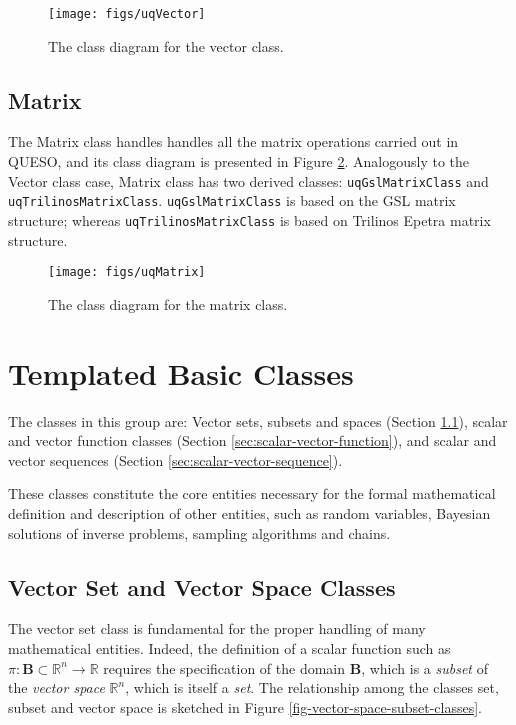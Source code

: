 \begin{figure}[!hpt]
\centering
\texttt{[image: figs/uqVector]}
\vspace*{-8pt}
\caption{ The class diagram for the vector class.}
\label{fig-vector-class}
\end{figure}



\subsection{Matrix}


The Matrix class handles handles all the matrix operations carried out in QUESO, and its class diagram is presented in Figure \ref{fig-matrix-class}. Analogously to the Vector class case,
Matrix class has two derived classes: \verb+uqGslMatrixClass+ and \verb+uqTrilinosMatrixClass+. \verb+uqGslMatrixClass+ is based on the GSL matrix structure; whereas \verb+uqTrilinosMatrixClass+ is based on Trilinos Epetra matrix structure.


\begin{figure}[!hp]
\centering
\texttt{[image: figs/uqMatrix]}
\vspace*{-8pt}
\caption{The class diagram for the matrix class.}
\label{fig-matrix-class}
\end{figure}


\section{Templated Basic Classes}
The classes in this group are: Vector sets, subsets and spaces (Section \ref{sec:vector-set-space}), scalar and vector function classes (Section \ref{sec:scalar-vector-function}), and scalar and vector sequences (Section \ref{sec:scalar-vector-sequence}).

These classes constitute the core entities necessary for the formal
mathematical definition and description of other entities, such as
random variables, Bayesian solutions of inverse problems, sampling algorithms and chains.



\subsection{Vector Set  and Vector Space Classes}\label{sec:vector-set-space}
%
The vector set class is fundamental for the proper handling of many mathematical entities.
Indeed, the definition of a scalar function such as $\pi:\mathbf{B}\subset\mathbb{R}^n\rightarrow\mathbb{R}$ requires the
specification of the domain $\mathbf{B}$, which is a {\it subset} of the {\it vector space} $\mathbb{R}^n$, which is itself a {\it set}.
The relationship among the classes set, subset and vector space is sketched in Figure \ref{fig-vector-space-subset-classes}.

